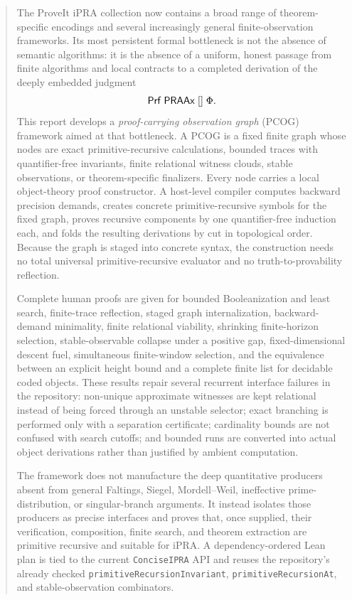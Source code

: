 \begin{abstract}
The ProveIt iPRA collection now contains a broad range of theorem-specific
encodings and several increasingly general finite-observation frameworks.  Its
most persistent formal bottleneck is not the absence of semantic algorithms:
it is the absence of a uniform, honest passage from finite algorithms and local
contracts to a completed derivation of the deeply embedded judgment
\[
   \Prf\;\PRAAx\;[]\;\Phi.
\]
This report develops a \emph{proof-carrying observation graph} (PCOG)
framework aimed at that bottleneck.  A PCOG is a fixed finite graph whose nodes
are exact primitive-recursive calculations, bounded traces with
quantifier-free invariants, finite relational witness clouds, stable
observations, or theorem-specific finalizers.  Every node carries a local
object-theory proof constructor.  A host-level compiler computes backward
precision demands, creates concrete primitive-recursive symbols for the fixed
graph, proves recursive components by one quantifier-free induction each, and
folds the resulting derivations by cut in topological order.  Because the graph
is staged into concrete syntax, the construction needs no total universal
primitive-recursive evaluator and no truth-to-provability reflection.

Complete human proofs are given for bounded Booleanization and least search,
finite-trace reflection, staged graph internalization, backward-demand
minimality, finite relational viability, shrinking finite-horizon selection,
stable-observable collapse under a positive gap, fixed-dimensional descent
fuel, simultaneous finite-window selection, and the equivalence between an
explicit height bound and a complete finite list for decidable coded objects.
These results repair several recurrent interface failures in the repository:
non-unique approximate witnesses are kept relational instead of being forced
through an unstable selector; exact branching is performed only with a
separation certificate; cardinality bounds are not confused with search
cutoffs; and bounded runs are converted into actual object derivations rather
than justified by ambient computation.

The framework does not manufacture the deep quantitative producers absent
from general Faltings, Siegel, Mordell--Weil, ineffective prime-distribution,
or singular-branch arguments.  It instead isolates those producers as precise
interfaces and proves that, once supplied, their verification, composition,
finite search, and theorem extraction are primitive recursive and suitable
for iPRA.  A dependency-ordered Lean plan is tied to the current
\texttt{ConciseIPRA} API and reuses the repository's already checked
\texttt{primitiveRecursionInvariant}, \texttt{primitiveRecursionAt}, and
stable-observation combinators.
\end{abstract}

